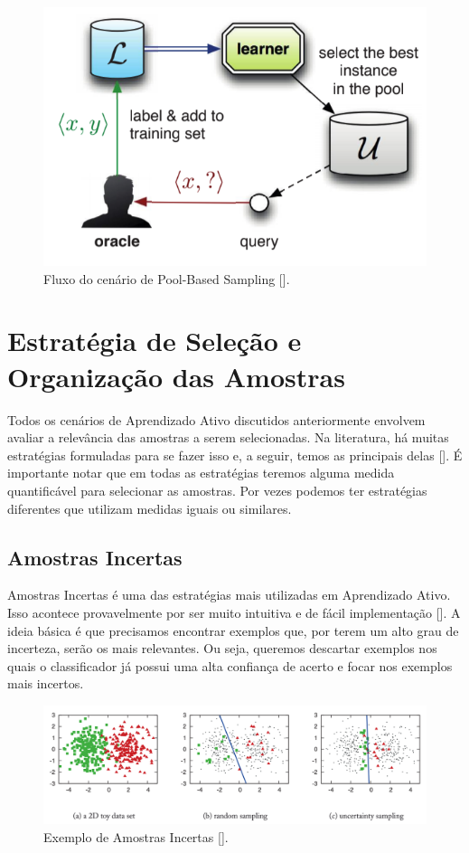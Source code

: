 \begin{figure}
  \centering
  \includegraphics[width=.5\textwidth]{figures/settles_2014_pool.png}
  \caption{Fluxo do cenário de Pool-Based Sampling [\cite{settles2014active}].}
  \label{fig:settles_2014_pool}
\end{figure}




\section{Estratégia de Seleção e Organização das Amostras}
\label{sec:query_strategy}

Todos os cenários de Aprendizado Ativo discutidos anteriormente envolvem avaliar a relevância das amostras a serem selecionadas. Na literatura, há muitas estratégias formuladas para se fazer isso e, a seguir, temos as principais delas [\cite{settles2012active}]. É importante notar que em todas as estratégias teremos alguma medida quantificável para selecionar as amostras. Por vezes podemos ter estratégias diferentes que utilizam medidas iguais ou similares.




\subsection{Amostras Incertas} %
\label{sec:amostras_incertas}

Amostras Incertas é uma das estratégias mais utilizadas em Aprendizado Ativo. Isso acontece provavelmente por ser muito intuitiva e de fácil implementação [\cite{settles2014active}]. A ideia básica é que precisamos encontrar exemplos que, por terem um alto grau de incerteza, serão os mais relevantes. Ou seja, queremos descartar exemplos nos quais o classificador já possui uma alta confiança de acerto e focar nos exemplos mais incertos.  


\begin{figure}
  \centering
  \includegraphics[width=1.0\textwidth]{figures/settles_2014_uncertainty_sampling_example.png}
  \caption{Exemplo de Amostras Incertas [\cite{settles2014active}].}
  \label{fig:settles_2014_uncertainty_example}
\end{figure}

